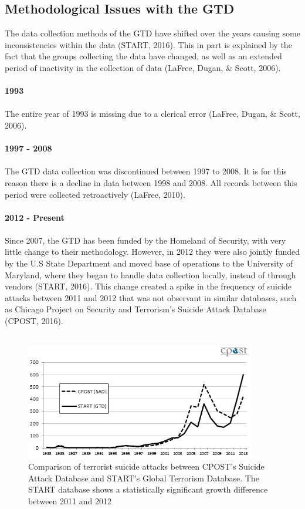 \documentclass[10pt,a4paper]{article}
\begin{document}
\subsection{Methodological Issues with the GTD}

The data collection methods of the GTD have shifted over the years causing some inconsistencies within the data (START, 2016). This in part is explained by the fact that the groups collecting the data have changed, as well as an extended period of inactivity in the collection of data (LaFree, Dugan, \& Scott, 2006).
\\\\

\textbf{1993}\\\\
The entire year of 1993 is missing due to a clerical error (LaFree, Dugan, \& Scott, 2006).\\\\

\textbf{1997 - 2008}\\\\
The GTD data collection was discontinued between 1997 to 2008. It is for this reason there is a decline in data between 1998 and 2008. All records between this period were collected retroactively (LaFree, 2010).
\\\\

\textbf{2012 - Present}\\\\
Since 2007, the GTD has been funded by the Homeland of Security, with very little change to their methodology. However, in 2012 they were also jointly funded by the U.S State Department and moved base of operations to the University of Maryland, where they began to handle data collection locally, instead of through vendors (START, 2016). This change created a spike in the frequency of suicide attacks between 2011 and 2012 that was not observant in similar databases, such as Chicago Project on Security and Terrorism’s Suicide Attack Database (CPOST, 2016).
\\\\
\begin{center}
\begin{figure}[h!]
\includegraphics[width=0.9\textwidth]{backgroundpic1.png}
\caption{Comparison of terrorist suicide attacks between CPOST’s Suicide Attack Database and START’s Global Terrorism Database. The START database shows a statistically significant growth difference between 2011 and 2012}
\end{figure}
\end{center}
\end{document}
